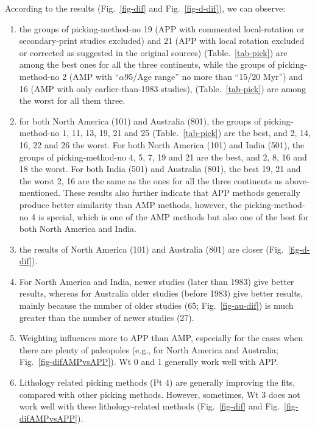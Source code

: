 According to the results (Fig.~\ref{fig-dif} and Fig.~\ref{fig-d-dif}), we can
observe:
%
\begin{enumerate}
  \item the groups of picking-method-no 19 (APP with commented local-rotation or
        secondary-print studies excluded) and 21 (APP with local rotation
        excluded or corrected as suggested in the original sources)
        (Table.~\ref{tab-pick}) are among the best ones for all the three
        continents, while the groups of picking-method-no 2 (AMP with
        ``$\alpha$95/Age range'' no more than ``15\degree/20 Myr'') and 16 (AMP
        with only earlier-than-1983 studies), (Table.~\ref{tab-pick}) are among
        the worst for all them three.
  \item for both North America (101) and Australia (801), the groups of
        picking-method-no 1, 11, 13, 19, 21 and 25 (Table.~\ref{tab-pick}) are
        the best, and 2, 14, 16, 22 and 26 the worst. For both North America
		(101) and India (501), the groups of picking-method-no 4, 5, 7, 19 and
		21 are the best, and 2, 8, 16 and 18 the worst. For both India (501)
		and Australia (801), the best 19, 21 and the worst 2, 16 are the same as
		the ones for all the three continents as above-mentioned. These results
		also further indicate that APP methods generally produce better
		similarity than AMP methods, however, the picking-method-no 4 is
		special, which is one of the AMP methods but also one of the best for
		both North America and India.
  \item the results of North America (101) and Australia (801) are closer
		(Fig.~\ref{fig-d-dif}).
  \item For North America and India, newer studies (later than 1983) give
		better results, whereas for Australia older studies (before 1983) give
		better results, mainly because the number of older studies (65;
		Fig.~\ref{fig-au-dif}) is much greater than the number of newer studies
		(27).
  \item Weighting influences more to APP than AMP, especially for the cases
		when there are plenty of paleopoles (e.g., for North America and
		Australia; Fig.~\ref{fig-difAMPvsAPP}). Wt 0 and 1 generally work well
		with APP.
  \item Lithology related picking methods (Pt 4) are generally
		improving the fits, compared with other picking methods. However,
		sometimes, Wt 3 does not work well with these lithology-related methods
		(Fig.~\ref{fig-dif} and Fig.~\ref{fig-difAMPvsAPP}).
\end{enumerate}

